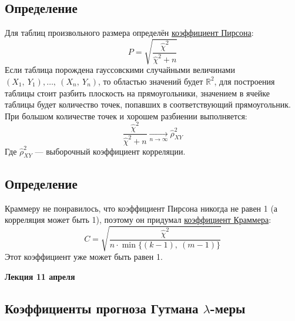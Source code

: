 \documentclass[12pt, a4paper]{article}
\begin{document}
\subsection*{Определение}
Для таблиц произвольного размера определён \underline{коэффициент Пирсона}:
\[P = \sqrt{\frac{\hat \chi^2}{\hat \chi^2 + n}}\]
Если таблица порождена гауссовскими случайными величинами $(X_1,\ Y_1),\dots,\ (X_n,\ Y_n)$, то областью значений будет $\mathbb{R}^2$, для построения таблицы стоит разбить плоскость на прямоугольники, значением в ячейке таблицы будет количество точек, попавших в соответствующий прямоугольник. При большом количестве точек и хорошем разбиении выполняется:
\[\frac{\hat \chi^2}{\hat \chi^2 + n} \xrightarrow[n\to\infty]{} \hat \rho^2_{X Y}\]
Где $\hat \rho_{XY}^2$ --- выборочный коэффициент корреляции.\\
\subsection*{Определение}
Краммеру не понравилось, что коэффициент Пирсона никогда не равен 1 (а корреляция может быть 1), поэтому он придумал \underline{коэффициент Краммера}:
\[C = \sqrt{\frac{\hat \chi^2}{n \cdot \min \{ (k - 1),\ (m - 1) \}}}\]
Этот коэффициент уже может быть равен 1.

\begin{center}
    \bf Лекция 11 апреля
\end{center}
\subsection*{Коэффициенты прогноза Гутмана $\lambda$-меры}
\end{document}

